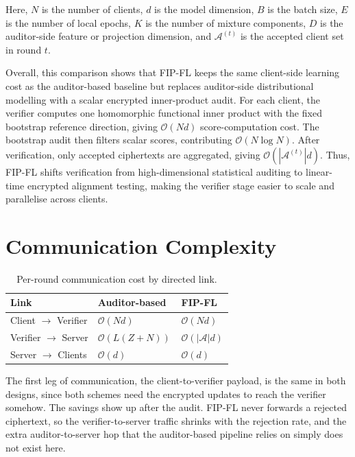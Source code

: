 Here, $N$ is the number of clients, $d$ is the model dimension, $B$ is the batch size, $E$ is the number of local epochs, $K$ is the number of mixture components, $D$ is the auditor-side feature or projection dimension, and $\mathcal{A}^{(t)}$ is the accepted client set in round $t$.

Overall, this comparison shows that FIP-FL keeps the same client-side learning cost as the auditor-based baseline but replaces auditor-side distributional modelling with a scalar encrypted inner-product audit. For each client, the verifier computes one homomorphic functional inner product with the fixed bootstrap reference direction, giving $\mathcal{O}(Nd)$ score-computation cost. The bootstrap audit then filters scalar scores, contributing $\mathcal{O}(N\log N)$. After verification, only accepted ciphertexts are aggregated, giving $\mathcal{O}(|\mathcal{A}^{(t)}|d)$. Thus, FIP-FL shifts verification from high-dimensional statistical auditing to linear-time encrypted alignment testing, making the verifier stage easier to scale and parallelise across clients.

\section{Communication Complexity}
\label{sec:comp-comm}

\begin{table}[H]
\centering
\caption{Per-round communication cost by directed link.}
\label{tab:comp-comm}
\begin{tabular}{@{}lll@{}}
\toprule
\textbf{Link} & \textbf{Auditor-based~\cite{yazdinejad2024robust}} & \textbf{FIP-FL} \\
\midrule
Client $\to$ Verifier & $\mathcal{O}(Nd)$ & $\mathcal{O}(Nd)$ \\
Verifier $\to$ Server & $\mathcal{O}(L(Z+N))$ & $\mathcal{O}(|\mathcal{A}|d)$ \\
Server $\to$ Clients  & $\mathcal{O}(d)$ & $\mathcal{O}(d)$ \\
\bottomrule
\end{tabular}
\end{table}

The first leg of communication, the client-to-verifier payload, is the same in both designs, since both schemes need the encrypted updates to reach the verifier somehow. The savings show up after the audit. FIP-FL never forwards a rejected ciphertext, so the verifier-to-server traffic shrinks with the rejection rate, and the extra auditor-to-server hop that the auditor-based pipeline relies on simply does not exist here.

